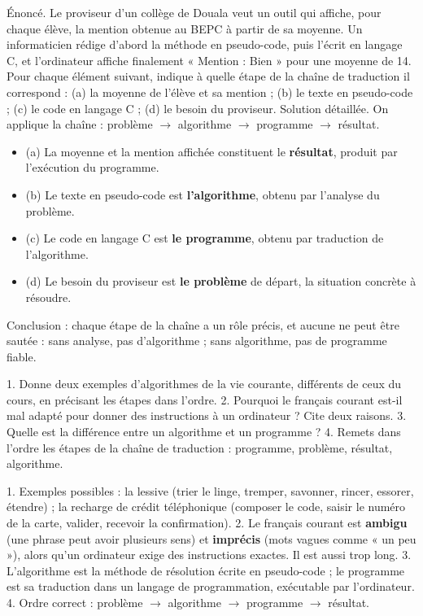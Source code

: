 \documentclass[11pt]{article}
\begin{document}
\begin{exoresolu}
Énoncé. Le proviseur d'un collège de Douala veut un outil qui affiche, pour chaque élève, la mention obtenue au BEPC à partir de sa moyenne. Un informaticien rédige d'abord la méthode en pseudo-code, puis l'écrit en langage C, et l'ordinateur affiche finalement « Mention : Bien » pour une moyenne de 14. Pour chaque élément suivant, indique à quelle étape de la chaîne de traduction il correspond : (a) la moyenne de l'élève et sa mention ; (b) le texte en pseudo-code ; (c) le code en langage C ; (d) le besoin du proviseur.
\tcblower
Solution détaillée. On applique la chaîne : problème $\rightarrow$ algorithme $\rightarrow$ programme $\rightarrow$ résultat.
\begin{itemize}
\item (a) La moyenne et la mention affichée constituent le \textbf{résultat}, produit par l'exécution du programme.
\item (b) Le texte en pseudo-code est \textbf{l'algorithme}, obtenu par l'analyse du problème.
\item (c) Le code en langage C est \textbf{le programme}, obtenu par traduction de l'algorithme.
\item (d) Le besoin du proviseur est \textbf{le problème} de départ, la situation concrète à résoudre.
\end{itemize}
Conclusion : chaque étape de la chaîne a un rôle précis, et aucune ne peut être sautée : sans analyse, pas d'algorithme ; sans algorithme, pas de programme fiable.
\end{exoresolu}

\begin{exercice}
1. Donne deux exemples d'algorithmes de la vie courante, différents de ceux du cours, en précisant les étapes dans l'ordre.
2. Pourquoi le français courant est-il mal adapté pour donner des instructions à un ordinateur ? Cite deux raisons.
3. Quelle est la différence entre un algorithme et un programme ?
4. Remets dans l'ordre les étapes de la chaîne de traduction : programme, problème, résultat, algorithme.
\end{exercice}

\begin{corrige}
1. Exemples possibles : la lessive (trier le linge, tremper, savonner, rincer, essorer, étendre) ; la recharge de crédit téléphonique (composer le code, saisir le numéro de la carte, valider, recevoir la confirmation).
2. Le français courant est \textbf{ambigu} (une phrase peut avoir plusieurs sens) et \textbf{imprécis} (mots vagues comme « un peu »), alors qu'un ordinateur exige des instructions exactes. Il est aussi trop long.
3. L'algorithme est la méthode de résolution écrite en pseudo-code ; le programme est sa traduction dans un langage de programmation, exécutable par l'ordinateur.
4. Ordre correct : problème $\rightarrow$ algorithme $\rightarrow$ programme $\rightarrow$ résultat.
\end{corrige}
\end{document}
